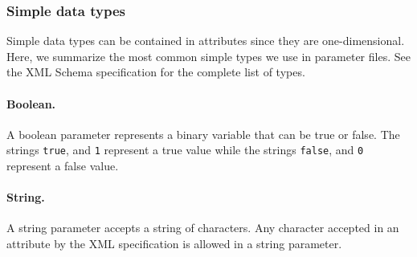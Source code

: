 \subsubsection{Simple data types}
\label{sec:simpledatatypes}

Simple data types can be contained in attributes since they are
one-dimensional.
Here, we summarize the most common simple types we use in parameter
files. See the XML Schema specification \cite{iSPE00a} for the
complete list of types.

\paragraph{Boolean.} A boolean parameter represents a binary variable that
can be true or false.  The strings \texttt{true},
and \texttt{1} represent a true value
while the strings
\texttt{false},
and \texttt{0} represent a false value.

\paragraph{String.} A string parameter accepts a string of characters.  Any
character accepted in an attribute by the XML specification is
allowed in a string parameter.

\begin{comment}
\paragraph{URL.}
A \emph{Uniform Resource Locator} (URL) can be used to refer to a
local file, a Web page, etc.
The main components of a URL is
the path to the resource, and the protocol (e.g., local file, HTTP,
FTP, etc.) used to access the resource.
A URL parameter is used to refer to an external resource, e.g., it can
point to a text file containing data.
A URL is \emph{absolute} when it contains all the necessary
information to refer to a resource.
For example, \ccurl{}
is an absolute URL pointing to a Web page.
A URL is \emph{relative} when it contains only partial information to
access the resource.
Relative URLs need to be resolved against a base URL in order to
obtain an absolute URL.
The base URL used when reading parameter file is the URL of the file
being parsed.
Consequently, a relative URL such as \texttt{file.dat} instructs the
program to search for a file named \texttt{file.dat} in the same
directory as the parameter file.
See the \path{java.net.URL} and \path{java.net.URI} classes in the
Java API specification for more information on the syntax of URLs.
\end{comment}


